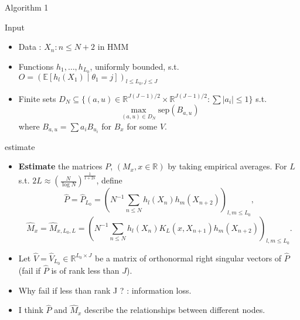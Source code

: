 \documentclass[10pt, aspectratio=169]{beamer}
\begin{document}
\begin{frame}{Algorithm 1}
    \begin{mytheorembox}{Input}
        \begin{itemize}[label=\scalebox{0.5}{$\bullet$}]
            \item Data : $X_n : n \leq N+2$ in HMM
            \item Functions $h_1, \ldots, h_{L_0}$, uniformly bounded, s.t. $O = (\mathbb{E}[h_l(X_1) \mid \theta_1 = j])_{l \leq L_0, j \leq J}$
            \item Finite sets $D_N \subseteq \{(a, u) \in \mathbb{R}^{J(J-1)/2} \times \mathbb{R}^{J(J-1)/2} : \sum |a_i| \leq 1\}$ s.t.
            \[
            \max_{(a, u) \in D_N} \text{sep}(B_{a, u})
            \]
            where $B_{a, u} = \sum a_i B_{u_i}$ for $B_x$ for some $V$.
        \end{itemize}
        
    \end{mytheorembox}
\end{frame}
\begin{frame}
    \begin{mytheorembox}{estimate}
        \begin{itemize}[label=\scalebox{0.5}{$\bullet$}]
             \item \textbf{Estimate} the matrices $P$, $(M_x, x \in \mathbb{R})$ by taking empirical averages. For $L$ s.t. $2L \approx \left(\frac{N}{\log N}\right)^{\frac{1}{1+2s}}$, define
            \[
            \hat{P} = \hat{P}_{L_0} = \left(N^{-1} \sum_{n \leq N} h_l(X_n) h_m(X_{n+2})\right)_{l, m \leq L_0},
            \]
            \[
            \hat{M}_x = \hat{M}_{x, L_0, L} = \left(N^{-1} \sum_{n \leq N} h_l(X_n) K_L(x, X_{n+1}) h_m(X_{n+2})\right)_{l, m \leq L_0}.
            \]
        
            \item Let $\hat{V} = \hat{V}_{L_0} \in \mathbb{R}^{L_0 \times J}$ be a matrix of orthonormal right singular vectors of $\hat{P}$ (fail if $\hat{P}$ is of rank less than $J$).
            
        \end{itemize}
        
    \end{mytheorembox}
    \begin{itemize}[label=\scalebox{0.5}{$\blacksquare$}]

        \item Why fail if less than rank J ? : information loss.
        \item I think $\hat{P}$ and $\hat{M}_x$ describe the relationships between different nodes.
        
        \end{itemize}
\end{frame}
\end{document}
